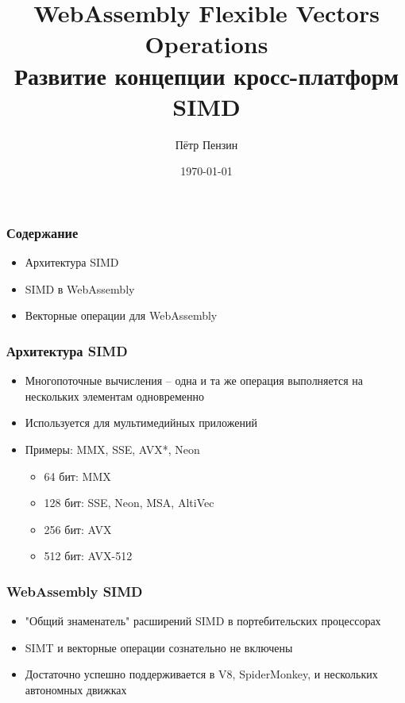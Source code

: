 \documentclass[t,aspectratio=169, xcolor={table}]{beamer}
\title{WebAssembly Flexible Vectors Operations\\Развитие концепции кросс-платформ SIMD}
\author{Пётр Пензин}
\date{\today}
\begin{document}
\begin{frame}[plain]
  \titlepage
\end{frame}
\begin{frame}
\frametitle{Содержание}
  \begin{itemize}
  \item Архитектура SIMD
  \item SIMD в WebAssembly
  \item Векторные операции для WebAssembly
  \end{itemize}
\end{frame}
\begin{frame}
\frametitle{Архитектура SIMD}
  \begin{itemize}
  \item Многопоточные вычисления -- одна и та же операция выполняется на нескольких элементам одновременно
  \item Используется для мультимедийных приложений \pause
  \item Примеры: MMX, SSE, AVX*, Neon
    \begin{itemize}
    \item 64 бит: MMX
    \item 128 бит: SSE, Neon, MSA, AltiVec
    \item 256 бит: AVX
    \item 512 бит: AVX-512
    \end{itemize}
  \end{itemize}
\end{frame}
\begin{frame}
\frametitle{WebAssembly SIMD}
  \begin{itemize}
  \item "Общий знаменатель" расширений SIMD в портебительских процессорах\footnotemark[1]
  \item SIMT и векторные операции сознательно не включены
  \item Достаточно успешно поддерживается в V8, SpiderMonkey, и нескольких автономных движках\footnotemark[2]
  \end{itemize}
\end{frame}
\end{document}
